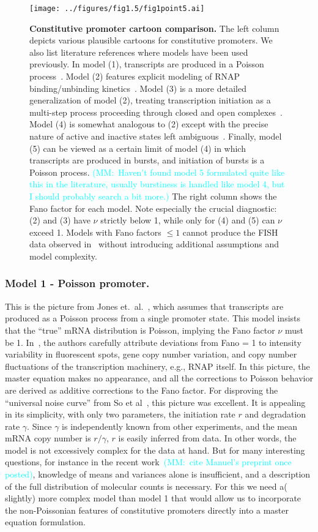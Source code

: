 \documentclass[12pt]{article}%
\newcommand{\mmnote}[1]{\textcolor{cyan}{(MM:~#1)}}
\begin{document}
\begin{figure}%
\centering
\texttt{[image: ../figures/fig1.5/fig1point5.ai]}
\caption{\textbf{Constitutive promoter cartoon comparison.}
The left column depicts various plausible cartoons for constitutive promoters.
We also list literature references where models have been used previously.
In model (1), transcripts are produced in a Poisson process~\cite{Jones2014}.
Model (2) features explicit modeling of RNAP binding/unbinding
kinetics~\cite{Phillips2015a}.
Model (3) is a more detailed generalization of model (2),
treating transcription initiation as a multi-step process
proceeding through closed and open complexes~\cite{Mitarai2015}.
Model (4) is somewhat analogous to (2) except with the precise nature
of active and inactive states left ambiguous~\cite{Razo-Mejia2020}.
Finally, model (5) can be viewed as a certain limit of model (4)
in which transcripts are produced in bursts,
and initiation of bursts is a Poisson process.
\mmnote{Haven't found model 5 formulated quite like this in the literature,
usually burstiness is handled like model 4, but I should probably search a bit more.}
The right column shows the Fano factor for each model.
Note especially the crucial diagnostic: (2) and (3) have $\nu$
strictly below 1, while only for (4) and (5) can $\nu$ exceed 1.
Models with Fano factors $\le 1$ cannot produce the FISH data
observed in~\cite{Jones2014} without introducing additional
assumptions and model complexity.
}
\label{fig:constit_cartoons}
\end{figure}

\subsubsection{Model 1 - Poisson promoter.}
This is the picture from Jones et.\ al.~\cite{Jones2014}, which
assumes that transcripts are produced as a Poisson process from a
single promoter state. This model insists that the ``true'' mRNA
distribution is Poisson, implying the Fano factor $\nu$ must be 1.
In~\cite{Jones2014}, the authors carefully attribute deviations
from Fano = 1 to intensity variability in fluorescent spots, gene
copy number variation, and copy number fluctuations of the
transcription machinery, e.g., RNAP itself.
In this picture, the master equation makes no appearance,
and all the corrections to Poisson behavior are derived
as additive corrections to the Fano factor.
For disproving the ``universal noise curve'' from So et
al~\cite{So2011}, this picture was excellent. It is appealing in
its simplicity, with only two parameters, the initiation rate $r$
and degradation rate $\gamma$. Since $\gamma$ is independently
known from other experiments, and the mean mRNA copy number is
$r/\gamma$, $r$ is easily inferred from data.
In other words, the model is not excessively complex for the data at hand.
But for many interesting questions, for instance in the recent
work~\mmnote{cite Manuel's preprint once posted},
knowledge of means and variances alone is insufficient, and a
description of the full distribution of molecular counts is necessary.
For this we need a( slightly) more complex model than model 1
that would allow us to incorporate the non-Poissonian features of
constitutive promoters directly into a master equation formulation.
\end{document}

